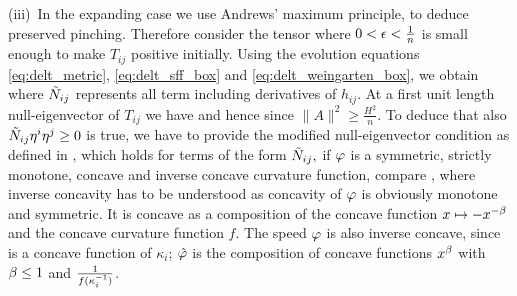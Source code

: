 \documentclass{amsart}
\begin{document}
{(iii)~In the expanding case we use Andrews' maximum principle, \cite[Thm.~3.2, Thm.~4.1]{Andrews:/2007} to deduce preserved pinching. Therefore consider the tensor
where $0<\e<\fr 1n$ is small enough to make $T_{ij}$ positive initially.
Using the evolution equations \eqref{eq:delt_metric}, \eqref{eq:delt_sff_box} and \eqref{eq:delt_weingarten_box}, we obtain
  where $\~N_{ij}$ represents all term including derivatives of $h_{ij}.$ At a first unit length null-eigenvector of $T_{ij}$ we have
and hence
since $\|A\|^2\geq \tfrac{H^2}{n}.$ To deduce that also $\~N_{ij}\eta^i\eta^j\geq 0$ is true, we have to provide the modified null-eigenvector condition as defined in \cite[Thm.~3.2]{Andrews:/2007}, which holds for terms of the form $\~N_{ij},$ if $\p$ is a symmetric, strictly monotone, concave and inverse concave curvature function, compare \cite[Thm.~4.1]{Andrews:/2007}, where inverse concavity has to be understood as concavity of
$\p$ is obviously monotone and symmetric. It is concave as a composition of the concave function $x\mt -x^{-\b}$ and the concave curvature function $f.$ The speed $\p$ is also inverse concave, since
 is a concave function of $\kappa_i$; $\hat{\p}$ is the composition of concave functions $x^{\b}$ with $\b\leq 1$ and $\fr{1}{f(\k_i^{-1})}$.
}



\end{document}
